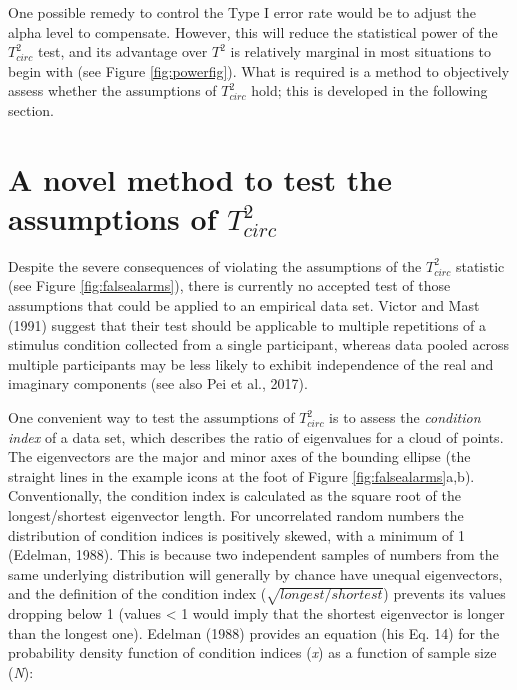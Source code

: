 \documentclass[]{article}
\begin{document}
One possible remedy to control the Type I error rate would be to adjust the alpha level to compensate. However, this will reduce the statistical power of the \(T^2_{circ}\) test, and its advantage over \(T^2\) is relatively marginal in most situations to begin with (see Figure \ref{fig:powerfig}). What is required is a method to objectively assess whether the assumptions of \(T^2_{circ}\) hold; this is developed in the following section.

\hypertarget{a-novel-method-to-test-the-assumptions-of-t2_circ}{%
\section{\texorpdfstring{A novel method to test the assumptions of \(T^2_{circ}\)}{A novel method to test the assumptions of T\^{}2\_\{circ\}}}\label{a-novel-method-to-test-the-assumptions-of-t2_circ}}

Despite the severe consequences of violating the assumptions of the \(T^2_{circ}\) statistic (see Figure \ref{fig:falsealarms}), there is currently no accepted test of those assumptions that could be applied to an empirical data set. Victor and Mast (1991) suggest that their test should be applicable to multiple repetitions of a stimulus condition collected from a single participant, whereas data pooled across multiple participants may be less likely to exhibit independence of the real and imaginary components (see also Pei et al., 2017).

One convenient way to test the assumptions of \(T^2_{circ}\) is to assess the \emph{condition index} of a data set, which describes the ratio of eigenvalues for a cloud of points. The eigenvectors are the major and minor axes of the bounding ellipse (the straight lines in the example icons at the foot of Figure \ref{fig:falsealarms}a,b). Conventionally, the condition index is calculated as the square root of the longest/shortest eigenvector length. For uncorrelated random numbers the distribution of condition indices is positively skewed, with a minimum of 1 (Edelman, 1988). This is because two independent samples of numbers from the same underlying distribution will generally by chance have unequal eigenvectors, and the definition of the condition index (\(\sqrt{longest/shortest}\)) prevents its values dropping below 1 (values \textless{} 1 would imply that the shortest eigenvector is longer than the longest one). Edelman (1988) provides an equation (his Eq. 14) for the probability density function of condition indices (\emph{x}) as a function of sample size (\emph{N}):
\end{document}
